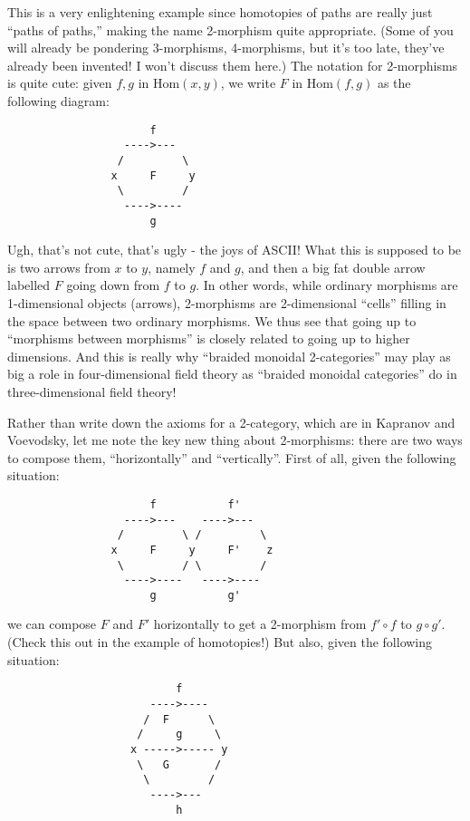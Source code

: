 \documentclass{article}
\begin{document}
This is a very enlightening example since homotopies of paths are really
just ``paths of paths,'' making the name 2-morphism quite appropriate.
(Some of you will already be pondering 3-morphisms, 4-morphisms, but
it's too late, they've already been invented! I won't discuss them
here.) The notation for 2-morphisms is quite cute: given \(f,g\) in
\(\mathrm{Hom}(x,y)\), we write \(F\) in \(\mathrm{Hom}(f,g)\) as the
following diagram:

\begin{verbatim}
                      f
                  ---->---
                 /         \
                x     F     y
                 \         /
                  ---->----
                      g
\end{verbatim}

Ugh, that's not cute, that's ugly - the joys of ASCII! What this is
supposed to be is two arrows from \(x\) to \(y\), namely \(f\) and
\(g\), and then a big fat double arrow labelled \(F\) going down from
\(f\) to \(g\). In other words, while ordinary morphisms are
1-dimensional objects (arrows), 2-morphisms are 2-dimensional ``cells''
filling in the space between two ordinary morphisms. We thus see that
going up to ``morphisms between morphisms'' is closely related to going
up to higher dimensions. And this is really why ``braided monoidal
2-categories'' may play as big a role in four-dimensional field theory
as ``braided monoidal categories'' do in three-dimensional field theory!

Rather than write down the axioms for a 2-category, which are in
Kapranov and Voevodsky, let me note the key new thing about 2-morphisms:
there are two ways to compose them, ``horizontally'' and ``vertically''.
First of all, given the following situation:

\begin{verbatim}
                      f           f'
                  ---->---    ---->---
                 /         \ /         \
                x     F     y     F'    z
                 \         / \         /
                  ---->----   ---->----
                      g           g'
\end{verbatim}

we can compose \(F\) and \(F'\) horizontally to get a 2-morphism from
\(f'\circ f\) to \(g \circ g'\). (Check this out in the example of
homotopies!) But also, given the following situation:

\begin{verbatim}
                          f
                      ---->----
                     /  F      \
                    /     g     \
                   x ----->----- y
                    \   G       /
                     \         /
                      ---->---
                          h
\end{verbatim}
\end{document}
